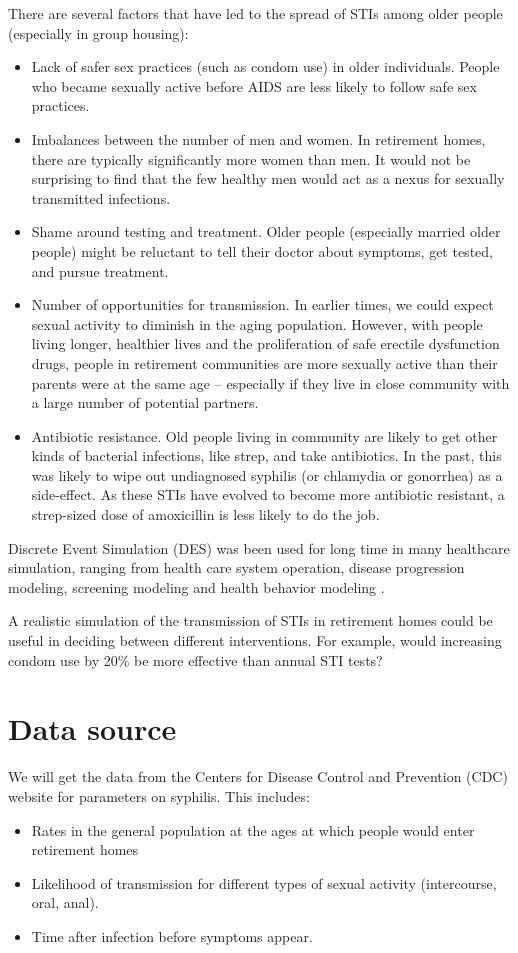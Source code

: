 \documentclass{article}
\begin{document}
\begin{normalsize}
    There are several factors that have led to the spread of STIs among older people (especially in group housing):
    \begin{itemize}
	\item Lack of safer sex practices (such as condom use) in older individuals. People who became sexually active before AIDS are less likely to follow safe sex practices.
    \item Imbalances between the number of men and women. In retirement homes, there are typically significantly more women than men. It would not be surprising to find that the few healthy men would act as a nexus for sexually transmitted infections.
    \item Shame around testing and treatment. Older people (especially married older people) might be reluctant to tell their doctor about symptoms, get tested, and pursue treatment.
    \item Number of opportunities for transmission. In earlier times, we could expect sexual activity to diminish in the aging population.  However, with people living longer, healthier lives and the proliferation of safe erectile dysfunction drugs, people in retirement communities are more sexually active than their parents were at the same age -- especially if they live in close community with a large number of potential partners.
    \item Antibiotic resistance. Old people living in community are likely to get other kinds of bacterial infections, like strep, and take antibiotics. In the past, this was likely to wipe out undiagnosed syphilis (or chlamydia or gonorrhea) as a side-effect. As these STIs have evolved to become more antibiotic resistant, a strep-sized dose of amoxicillin is less likely to do the job.
    \end{itemize}
    
    Discrete Event Simulation (DES) was been used for long time in many healthcare simulation, ranging from health care system operation, disease progression modeling, screening modeling and health behavior modeling \cite{lebcir2017, Zhang2018}. 
    
    
     A realistic simulation of the transmission of STIs in retirement homes could be useful in deciding between different interventions.  For example, would increasing condom use by 20\% be more effective than annual STI tests?
        
     \section{Data source}
    We will get the data from the Centers for Disease Control and Prevention (CDC) website for parameters on syphilis. This includes:
    \begin{itemize}
    \item Rates in the general population at the ages at which people would enter retirement homes
   	\item Likelihood of transmission for different types of sexual activity (intercourse, oral, anal).
   	\item Time after infection before symptoms appear.
   	\end{itemize}
   	

\end{normalsize}
\end{document}
